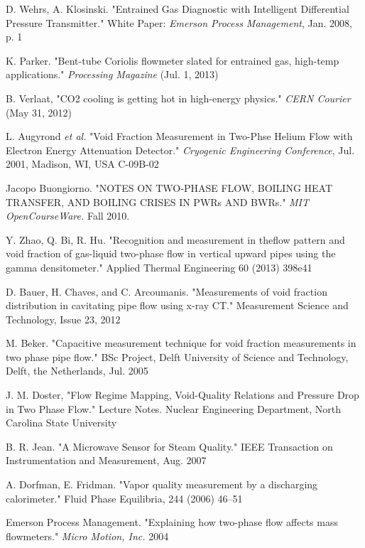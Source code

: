 \documentclass{report}
\begin{document}
\begin{thebibliography}{9}
D. Wehrs, A. Klosinski. "Entrained Gas Diagnostic with Intelligent Differential Pressure Transmitter." White Paper: \textit{Emerson Process Management}, Jan. 2008, p. 1

K. Parker. "Bent-tube Coriolis flowmeter slated for entrained gas, high-temp applications." \textit{Processing Magazine} (Jul. 1, 2013)

B. Verlaat, "CO2 cooling is getting hot in high-energy physics." \textit{CERN Courier} (May 31, 2012)

L. Augyrond \textit{et al.} "Void Fraction Measurement in Two-Phse Helium Flow with Electron Energy Attenuation Detector." \textit{Cryogenic Engineering Conference}, Jul. 2001, Madison, WI, USA C-09B-02

Jacopo Buongiorno. "NOTES ON TWO‐PHASE FLOW, BOILING HEAT TRANSFER, AND BOILING CRISES
IN PWRs AND BWRs." \textit{MIT OpenCourseWare.} Fall 2010.

Y. Zhao, Q. Bi, R. Hu. "Recognition and measurement in theflow pattern and void fraction of gas-liquid two-phase flow in vertical upward pipes using the gamma densitometer." Applied Thermal Engineering 60 (2013) 398e41

D. Bauer, H. Chaves, and C. Arcoumanis. "Measurements of void fraction distribution in cavitating pipe flow
using x-ray CT." Measurement Science and Technology, Issue 23, 2012

M. Beker. "Capacitive measurement technique for void fraction measurements in two phase pipe flow." BSc Project, Delft University of Science and Technology, Delft, the Netherlands, Jul. 2005

J. M. Doster, "Flow Regime Mapping, Void-Quality Relations and Pressure Drop in Two Phase Flow." Lecture Notes. Nuclear Engineering Department, North Carolina State University 

B. R. Jean. "A Microwave Sensor for Steam Quality." IEEE Transaction on Instrumentation and Measurement, Aug. 2007

A. Dorfman, E. Fridman. "Vapor quality measurement by a discharging calorimeter." Fluid Phase Equilibria, 244 (2006) 46–51

Emerson Process Management. "Explaining how two-phase flow affects mass flowmeters." \textit{Micro Motion, Inc.} 2004

\end{thebibliography}
\appendix
\end{document}
